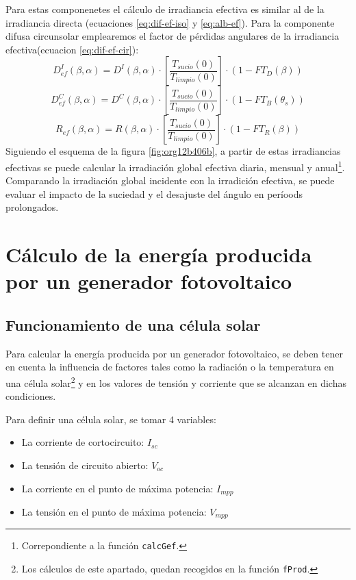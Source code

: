 Para estas componenetes el cálculo de irradiancia efectiva es similar al de la irradiancia directa (ecuaciones \ref{eq:dif-ef-iso} y \ref{eq:alb-ef}). Para la componente difusa circunsolar emplearemos el factor de pérdidas angulares de la irradiancia efectiva(ecuacion \ref{eq:dif-ef-cir}):
\begin{equation}
D_{ef}^I(\beta ,\alpha)=D^I(\beta ,\alpha)\cdot[\frac{T_{sucio}(0)}{T_{limpio}(0)}]\cdot (1-FT_D(\beta))
\label{eq:dif-ef-iso}
\end{equation}
\begin{equation}
D_{ef}^C(\beta ,\alpha)=D^C(\beta ,\alpha)\cdot[\frac{T_{sucio}(0)}{T_{limpio}(0)}]\cdot (1-FT_B(\theta_s))
\label{eq:dif-ef-cir}
\end{equation}
\begin{equation}
R_{ef}(\beta ,\alpha)=R(\beta ,\alpha)\cdot[\frac{T_{sucio}(0)}{T_{limpio}(0)}]\cdot (1-FT_R(\beta))
\label{eq:alb-ef}
\end{equation}
Siguiendo el esquema de la figura \ref{fig:org12b406b}, a partir de estas irradiancias efectivas se puede calcular la irradiación global efectiva diaria, mensual y anual\footnote{Correpondiente a la función \texttt{calcGef}.}. Comparando la irradiación global incidente con la irradición efectiva, se puede evaluar el impacto de la suciedad y el desajuste del ángulo en períoods prolongados.

\section{Cálculo de la energía producida por un generador fotovoltaico}
\label{sec:org7211aef}
\label{sec:calculo-energia-producida-generador}

\subsection{Funcionamiento de una célula solar}
\label{sec:orgf4b0595}
\label{subsec:funcionamiento-celula-solar}
Para calcular la energía producida por un generador fotovoltaico, se deben tener en cuenta la influencia de factores tales como la radiación o la temperatura en una célula solar\footnote{Los cálculos de este apartado, quedan recogidos en la función \texttt{fProd}.} y en los valores de tensión y corriente que se alcanzan en dichas condiciones.

Para definir una célula solar, se tomar 4 variables:
\begin{itemize}
\item La corriente de cortocircuito: \(I_{sc}\)
\item La tensión de circuito abierto: \(V_{oc}\)
\item La corriente en el punto de máxima potencia: \(I_{mpp}\)
\item La tensión en el punto de máxima potencia: \(V_{mpp}\)
\end{itemize}

